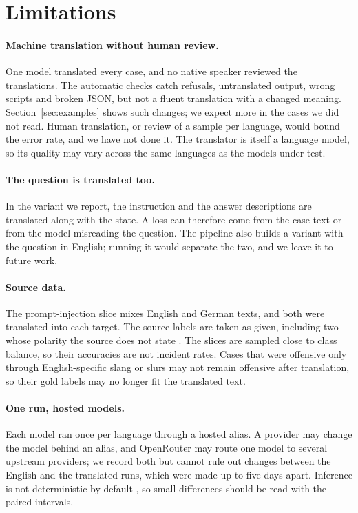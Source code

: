 \section{Limitations}
\label{sec:limitations}

\paragraph{Machine translation without human review.} One model translated
every case, and no native speaker reviewed the translations. The automatic
checks catch refusals, untranslated output, wrong scripts and broken JSON, but
not a fluent translation with a changed meaning. Section~\ref{sec:examples}
shows such changes; we expect more in the cases we did not read. Human
translation, or review of a sample per language, would bound the error rate,
and we have not done it. The translator is itself a language model, so its
quality may vary across the same languages as the models under test.

\paragraph{The question is translated too.} In the variant we report, the
instruction and the answer descriptions are translated along with the state.
A loss can therefore come from the case text or from the model misreading the
question. The pipeline also builds a variant with the question in English;
running it would separate the two, and we leave it to future work.

\paragraph{Source data.} The prompt-injection slice mixes English and German
texts, and both were translated into each target. The source labels are taken
as given, including two whose polarity the source does not state
\citep{pai2026jevbench}. The slices are sampled close to class balance, so
their accuracies are not incident rates. Cases that were offensive only through
English-specific slang or slurs may not remain offensive after translation, so
their gold labels may no longer fit the translated text.

\paragraph{One run, hosted models.} Each model ran once per language through a
hosted alias. A provider may change the model behind an alias, and OpenRouter
may route one model to several upstream providers; we record both but cannot
rule out changes between the English and the translated runs, which were made
up to five days apart. Inference is not deterministic by default
\citep{he2025nondeterminism}, so small differences should be read with the
paired intervals.

